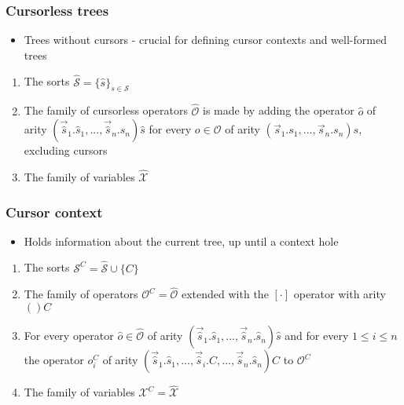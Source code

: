 \documentclass[t,24pt,aspectratio=169]{beamer}
\begin{document}
\begin{frame}
    \frametitle{Cursorless trees}
    \begin{itemize}
        \item Trees without cursors - crucial for defining cursor contexts and well-formed trees
    \end{itemize}
    \vspace{1cm}
    \begin{enumerate}
        \item The sorts $\hat{\mathcal{S}} = \{ \hat{s} \}_{s \in \mathcal{S}}$
        \item The family of cursorless operators $\hat{\mathcal{O}}$ is made by adding
              the operator $\hat{o}$ of arity
              $(\vec{\hat{s}}_1.\hat{s}_1,...,\vec{\hat{s}}_n.\hat{s}_n)\hat{s}$
              for every $o \in \mathcal{O}$ of arity $(\vec{s}_1.s_1,...,\vec{s}_n.s_n)s$, excluding cursors
        \item The family of variables $\hat{\mathcal{X}}$
    \end{enumerate}
\end{frame}

\begin{frame}
    \frametitle{Cursor context}
    \begin{itemize}
        \item Holds information about the current tree, up until a context hole
    \end{itemize}
    \vspace{1cm}
    \begin{enumerate}
        \item The sorts $\mathcal{S}^C = \hat{\mathcal{S}} \cup \{C\}$
        \item The family of operators $\mathcal{O}^C = \hat{\mathcal{O}}$ extended with the $[\cdot]$ operator with arity $()C$
        \item For every operator $\hat{o} \in \hat{\mathcal{O}}$ of arity $(\vec{\hat{s}}_1.\hat{s}_1,...,\vec{\hat{s}}_n.\hat{s}_n)\hat{s}$ and for every $1 \leq i \leq n$ the operator $o_i^C$ of arity $(\vec{\hat{s}}_1.\hat{s}_1,...,\vec{\hat{s}}_i.C,...,\vec{\hat{s}}_n.\hat{s}_n)C$ to $\mathcal{O}^C$
        \item The family of variables $\mathcal{X}^C = \hat{\mathcal{X}}$
    \end{enumerate}
\end{frame}
\end{document}
